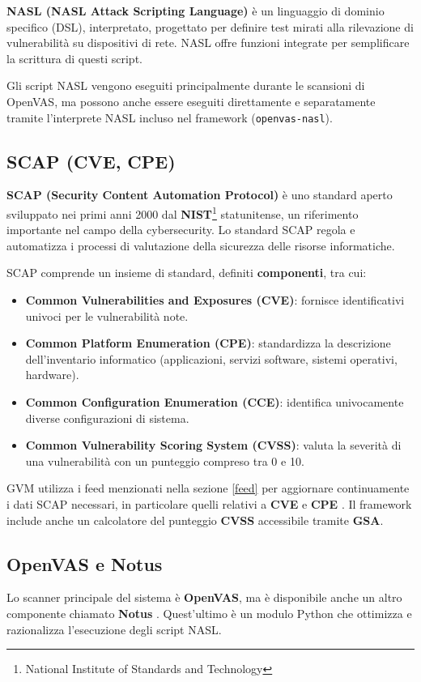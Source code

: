 \textbf{NASL (NASL Attack Scripting Language)} \`e un linguaggio di dominio specifico (DSL), interpretato, progettato per definire test mirati alla rilevazione di vulnerabilità su dispositivi di rete. NASL offre funzioni integrate per semplificare la scrittura di questi script.

Gli script NASL vengono eseguiti principalmente durante le scansioni di OpenVAS, ma possono anche essere eseguiti direttamente e separatamente tramite l'interprete NASL incluso nel framework (\texttt{openvas-nasl}).

\subsection{SCAP (CVE, CPE)}
\textbf{SCAP (Security Content Automation Protocol)} è uno standard aperto sviluppato nei primi anni 2000 dal \textbf{NIST}\footnote{National Institute of Standards and Technology} statunitense, un riferimento importante nel campo della cybersecurity. Lo standard SCAP regola e automatizza i processi di valutazione della sicurezza delle risorse informatiche.

SCAP comprende un insieme di standard, definiti \textbf{componenti}, tra cui:
\begin{itemize}
    \item \textbf{Common Vulnerabilities and Exposures (CVE)}: fornisce identificativi univoci per le vulnerabilità note.
    \item \textbf{Common Platform Enumeration (CPE)}: standardizza la descrizione dell'inventario informatico (applicazioni, servizi software, sistemi operativi, hardware).
    \item \textbf{Common Configuration Enumeration (CCE)}: identifica univocamente diverse configurazioni di sistema.
    \item \textbf{Common Vulnerability Scoring System (CVSS)}: valuta la severità di una vulnerabilità con un punteggio compreso tra 0 e 10.
\end{itemize}

GVM utilizza i feed menzionati nella sezione \ref{feed} per aggiornare continuamente i dati SCAP necessari, in particolare quelli relativi a \textbf{CVE} e \textbf{CPE} \cite{greenbone-scap}. Il framework include anche un calcolatore del punteggio \textbf{CVSS} accessibile tramite \textbf{GSA}.

\subsection{OpenVAS e Notus}
\label{notus}
Lo scanner principale del sistema è \textbf{OpenVAS}, ma è disponibile anche un altro componente chiamato \textbf{Notus} \cite{notus-scanner}. Quest'ultimo è un modulo Python che ottimizza e razionalizza l'esecuzione degli script NASL.

